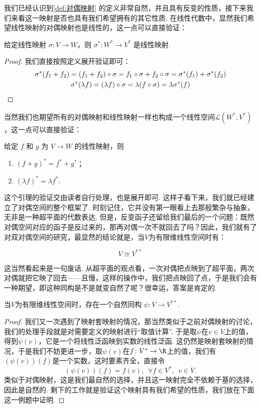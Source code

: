 我们已经认识到\autoref{def:对偶映射} 的定义非常自然，并且具有反变的性质，接下来我们来看这一映射是否也具有我们希望拥有的其它性质. 在线性代数中，显然我们希望线性映射的对偶映射也是线性的，这一点可以直接验证：
\begin{lemma}{}{}
    给定线性映射 $\sigma\colon V \to W$，则 $\sigma^*: W^* \to V^*$ 是线性映射.
\end{lemma}
\begin{proof}
    我们直接按照定义展开验证即可：
    \begin{gather*}
        \sigma^*(f_1+f_2)=(f_1+f_2)\circ\sigma=f_1\circ\sigma+f_2\circ\sigma=\sigma^*(f_1)+\sigma^*(f_2) \\
        \sigma^*(\lambda f)=(\lambda f)\circ\sigma=\lambda(f\circ\sigma)=\lambda\sigma^*(f) \qedhere
    \end{gather*}
\end{proof}

当然我们也期望所有的对偶映射和线性映射一样也构成一个线性空间$\mathcal{L}(W^*,V^*)$，这一点可以直接验证：
\begin{lemma}{}{}
    给定 $f$ 和 $g$ 为 $V \to W$ 的线性映射，则
    \begin{enumerate}
        \item $(f + g)^* = f^* + g^*$；
        \item $(\lambda f)^* = \lambda f^*$.
    \end{enumerate}
\end{lemma}

这个引理的验证交由读者自行处理，也是展开即可. 这样子看下来，我们就已经建立了对偶空间的整个框架了. 时刻记住，它并没有第一眼看上去那般繁杂与抽象，无非是一种超平面的代数表达. 但是，反变函子还留给我们最后的一个问题：既然对偶空间对应的函子是反过来的，那再对偶一次不就回去了吗？因此，我们就有了对双对偶空间的研究，最显然的结论就是，当$V$为有限维线性空间时有：

\[
    V \cong V^{**}
\]

这当然看起来是一句废话. 从超平面的观点看，一次对偶把点映到了超平面，两次对偶就把它映了回去——且慢，这样的操作中，我们把点映回了点，于是我们会有一种期望，即这种同构是不是就变自然了呢？很幸运，答案是肯定的.

\begin{theorem}{}{}
    当$V$为有限维线性空间时，存在一个自然同构 $\psi: V \to V^{**}$.
\end{theorem}

\begin{proof}
    我们又一次遇到了映射套映射的情况，那当然类似于之前对偶映射的讨论，我们的处理手段就是对需要定义的映射进行``取值计算''. 于是取$\psi$在$v\in V$上的值，得到$\psi(v)$，它是一个将线性泛函映到实数的线性泛函. 这仍然是映射套映射的情况，于是我们不妨更进一步，取$\psi(v)$在$f\colon V^*\to\R$上的值，我们有$(\psi(v))(f)$是一个实数，这时要素齐全，直接令
    \[(\psi(v))(f) = f(v),\enspace\forall f\in V^*,\enspace v\in V.\]
    类似于对偶映射，这是我们最自然的选择，并且这一映射完全不依赖于基的选择，因此是自然的. 剩下的工作就是验证这个映射具有我们希望的性质，我们放在下面这一例题中证明.
\end{proof}

